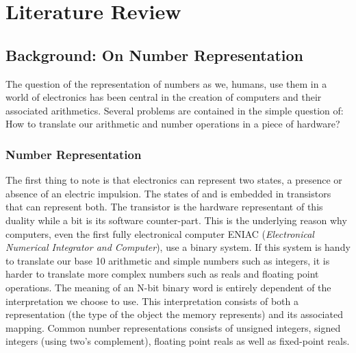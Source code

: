 \chapter{Literature Review} %

\label{Chapter2} %



\section{Background: On Number Representation}

The question of the representation of numbers as we, humans, use them in a world of electronics has been central in the creation of computers and their associated arithmetics. Several problems are contained in the simple question of: How to translate our arithmetic and number operations in a piece of hardware?

\subsection{Number Representation}

The first thing to note is that electronics can represent two states, a presence or absence of an electric impulsion. The states of  and  is embedded in transistors that can represent both. The transistor is the hardware representant of this duality while a bit is its software counter-part. This is the underlying reason why computers, even the first fully electronical computer ENIAC (\emph{Electronical Numerical Integrator and Computer}), use a binary system. If this system is handy to translate our base 10 arithmetic and simple numbers such as integers, it is harder to translate more complex numbers such as reals and floating point operations. The meaning of an N-bit binary word is entirely dependent of the interpretation we choose to use. This interpretation consists of both a representation (the type of the object the memory represents) and its associated mapping. Common number representations consists of unsigned integers, signed integers (using two's complement), floating point reals as well as fixed-point reals.

